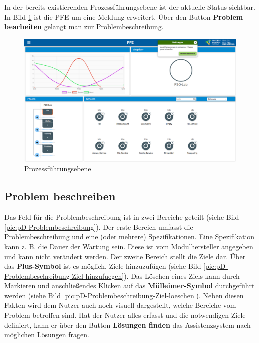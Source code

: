 In der bereits existierenden Prozessführungsebene ist der aktuelle Status sichtbar. In Bild \ref{pic:pD-PFE} ist die PFE um eine Meldung erweitert. Über den Button \textbf{Problem bearbeiten} gelangt man zur Problembeschreibung.
\begin{figure}[htbp]
\centering
\includegraphics[angle=90, scale=0.47]{DA_files/Bilder/Konzept/Skizze-PFE.png}
\caption{Prozessführungsebene}
\label{pic:pD-PFE}
\end{figure}

\subsection{Problem beschreiben}
Das Feld für die Problembeschreibung ist in zwei Bereiche geteilt (siehe Bild \ref{pic:pD-Problembeschreibung}). Der erste Bereich umfasst die Problembeschreibung und eine (oder mehrere) Spezifikationen. Eine Spezifikation kann z. B. die Dauer der Wartung sein. Diese ist vom Modulhersteller angegeben und kann nicht verändert werden. Der zweite Bereich stellt die Ziele dar. Über das \textbf{Plus-Symbol} ist es möglich, Ziele hinzuzufügen (siehe Bild \ref{pic:pD-Problembeschreibung-Ziel-hinzufuegen}). Das Löschen eines Ziels kann durch Markieren und anschließendes Klicken auf das \textbf{Mülleimer-Symbol }durchgeführt werden (siehe Bild \ref{pic:pD-Problembeschreibung-Ziel-loeschen}). Neben diesen Fakten wird dem Nutzer auch noch visuell dargestellt, welche Bereiche vom Problem betroffen sind.
Hat der Nutzer alles erfasst und die notwendigen Ziele definiert, kann er über den Button \textbf{Lösungen finden} das Assistenzsystem nach möglichen Lösungen fragen.

